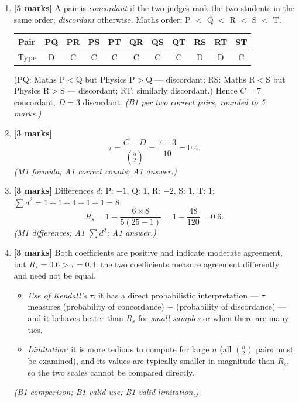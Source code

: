 \documentclass[11pt]{article}
\begin{document}
\begin{corrige}
\begin{enumerate}
\item \textbf{[5 marks]} A pair is \emph{concordant} if the two judges rank the two students in the same order, \emph{discordant} otherwise. Maths order: P $<$ Q $<$ R $<$ S $<$ T.
\begin{center}
\begin{tabular}{|l|c|c|c|c|c|c|c|c|c|c|}
\hline
Pair & PQ & PR & PS & PT & QR & QS & QT & RS & RT & ST \\
\hline
Type & D & C & C & C & C & C & C & D & D & C \\
\hline
\end{tabular}
\end{center}
(PQ: Maths P$<$Q but Physics P$>$Q — discordant; RS: Maths R$<$S but Physics R$>$S — discordant; RT: similarly discordant.) Hence $C = 7$ concordant, $D = 3$ discordant. \emph{(B1 per two correct pairs, rounded to 5 marks.)}
\item \textbf{[3 marks]}
\[
\tau = \frac{C - D}{\binom{5}{2}} = \frac{7 - 3}{10} = \boxed{0.4}.
\]
\emph{(M1 formula; A1 correct counts; A1 answer.)}
\item \textbf{[3 marks]} Differences $d$: P: $-1$, Q: $1$, R: $-2$, S: $1$, T: $1$; $\sum d^2 = 1+1+4+1+1 = 8$.
\[
R_s = 1 - \frac{6 \times 8}{5(25-1)} = 1 - \frac{48}{120} = \boxed{0.6}.
\]
\emph{(M1 differences; A1 $\sum d^2$; A1 answer.)}
\item \textbf{[3 marks]} Both coefficients are positive and indicate moderate agreement, but $R_s = 0.6 > \tau = 0.4$: the two coefficients measure agreement differently and need not be equal.
\begin{itemize}
\item \emph{Use of Kendall's $\tau$:} it has a direct probabilistic interpretation — $\tau$ measures (probability of concordance) $-$ (probability of discordance) — and it behaves better than $R_s$ for \emph{small samples} or when there are many ties.
\item \emph{Limitation:} it is more tedious to compute for large $n$ (all $\binom{n}{2}$ pairs must be examined), and its values are typically smaller in magnitude than $R_s$, so the two scales cannot be compared directly.
\end{itemize}
\emph{(B1 comparison; B1 valid use; B1 valid limitation.)}
\end{enumerate}
\end{corrige}
\end{document}
